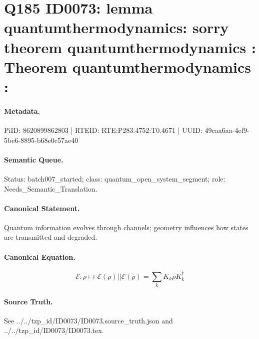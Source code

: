 \section*{Q185 ID0073: lemma quantumthermodynamics: sorry theorem quantumthermodynamics : Theorem quantumthermodynamics :}
\paragraph{Metadata.}
PiID: 8620899862803 | RTEID: RTE:P283.4752:T0.4671 | UUID: 49caa6aa-4ef9-5be6-8895-b68e0c57ae40

\paragraph{Semantic Queue.}
Status: batch007\_started; class: quantum\_open\_system\_segment; role: Needs\_Semantic\_Translation.

\paragraph{Canonical Statement.}
Quantum information evolves through channels; geometry influences how states are transmitted and degraded.

\paragraph{Canonical Equation.}
\[
\mathcal{E}:\rho \mapsto \mathcal{E}(\rho) || \mathcal{E}(\rho) = \sum_{k} K_{k}\rho K_{k}^{\dagger}
\]

\paragraph{Source Truth.}
See ../../tzp\_id/ID0073/ID0073.source\_truth.json and ../../tzp\_id/ID0073/ID0073.tex.
